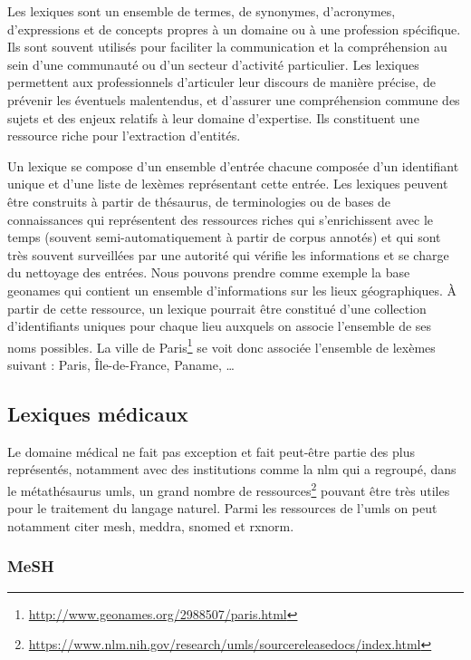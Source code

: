 Les lexiques sont un ensemble de termes, de synonymes, d'acronymes, d'expressions et de concepts propres à un domaine ou à une profession spécifique.
Ils sont souvent utilisés pour faciliter la communication et la compréhension au sein d'une communauté ou d'un secteur d'activité particulier.
Les lexiques permettent aux professionnels d'articuler leur discours de manière précise, de prévenir les éventuels malentendus, et d'assurer une compréhension commune des sujets et des enjeux relatifs à leur domaine d'expertise.
Ils constituent une ressource riche pour l'extraction d'entités.

Un lexique se compose d'un ensemble d'entrée chacune composée d'un identifiant unique et d'une liste de lexèmes représentant cette entrée.
Les lexiques peuvent être construits à partir de thésaurus, de terminologies ou de bases de connaissances qui représentent des ressources riches qui s'enrichissent avec le temps (souvent semi-automatiquement à partir de corpus annotés) et qui sont très souvent surveillées par une autorité qui vérifie les informations et se charge du nettoyage des entrées.
Nous pouvons prendre comme exemple la base \gls{geonames} qui contient un ensemble d'informations sur les lieux géographiques.
À partir de cette ressource, un lexique pourrait être constitué d'une collection d'identifiants uniques pour chaque lieu auxquels on associe l'ensemble de ses noms possibles.
La ville de Paris\footnote{\url{http://www.geonames.org/2988507/paris.html}} se voit donc associée l'ensemble de lexèmes suivant : Paris, Île-de-France, Paname, \dots

\subsection{Lexiques médicaux}

Le domaine médical ne fait pas exception et fait peut-être partie des plus représentés, notamment avec des institutions comme la \gls{nlm} qui a regroupé, dans le métathésaurus \gls{umls}, un grand nombre de ressources\footnote{\url{https://www.nlm.nih.gov/research/umls/sourcereleasedocs/index.html}} pouvant être très utiles pour le traitement du langage naturel.
Parmi les ressources de l'\gls{umls} on peut notamment citer \gls{mesh}, \gls{meddra}, \gls{snomed} et \gls{rxnorm}.

\subsubsection{MeSH}

